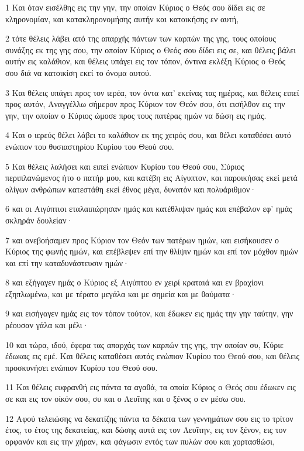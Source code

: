 \par 1 Και όταν εισέλθης εις την γην, την οποίαν Κύριος ο Θεός σου δίδει εις σε κληρονομίαν, και κατακληρονομήσης αυτήν και κατοικήσης εν αυτή,
\par 2 τότε θέλεις λάβει από της απαρχής πάντων των καρπών της γης, τους οποίους συνάξης εκ της γης σου, την οποίαν Κύριος ο Θεός σου δίδει εις σε, και θέλεις βάλει αυτήν εις καλάθιον, και θέλεις υπάγει εις τον τόπον, όντινα εκλέξη Κύριος ο Θεός σου διά να κατοικίση εκεί το όνομα αυτού.
\par 3 Και θέλεις υπάγει προς τον ιερέα, τον όντα κατ' εκείνας τας ημέρας, και θέλεις ειπεί προς αυτόν, Αναγγέλλω σήμερον προς Κύριον τον Θεόν σου, ότι εισήλθον εις την γην, την οποίαν ο Κύριος ώμοσε προς τους πατέρας ημών να δώση εις ημάς.
\par 4 Και ο ιερεύς θέλει λάβει το καλάθιον εκ της χειρός σου, και θέλει καταθέσει αυτό ενώπιον του θυσιαστηρίου Κυρίου του Θεού σου.
\par 5 Και θέλεις λαλήσει και ειπεί ενώπιον Κυρίου του Θεού σου, Σύριος περιπλανώμενος ήτο ο πατήρ μου, και κατέβη εις Αίγυπτον, και παροικήσας εκεί μετά ολίγων ανθρώπων κατεστάθη εκεί έθνος μέγα, δυνατόν και πολυάριθμον·
\par 6 και οι Αιγύπτιοι εταλαιπώρησαν ημάς και κατέθλιψαν ημάς και επέβαλον εφ' ημάς σκληράν δουλείαν·
\par 7 και ανεβοήσαμεν προς Κύριον τον Θεόν των πατέρων ημών, και εισήκουσεν ο Κύριος της φωνής ημών, και επέβλεψεν επί την θλίψιν ημών και επί τον μόχθον ημών και επί την καταδυνάστευσιν ημών·
\par 8 και εξήγαγεν ημάς ο Κύριος εξ Αιγύπτου εν χειρί κραταιά και εν βραχίονι εξηπλωμένω, και με τέρατα μεγάλα και με σημεία και με θαύματα·
\par 9 και εισήγαγεν ημάς εις τον τόπον τούτον, και έδωκεν εις ημάς την γην ταύτην, γην ρέουσαν γάλα και μέλι·
\par 10 και τώρα, ιδού, έφερα τας απαρχάς των καρπών της γης, την οποίαν συ, Κύριε έδωκας εις εμέ. Και θέλεις καταθέσει αυτάς ενώπιον Κυρίου του Θεού σου, και θέλεις προσκυνήσει ενώπιον Κυρίου του Θεού σου.
\par 11 Και θέλεις ευφρανθή εις πάντα τα αγαθά, τα οποία Κύριος ο Θεός σου έδωκεν εις σε και εις τον οίκόν σου, συ και ο Λευΐτης και ο ξένος ο εν μέσω σου.
\par 12 Αφού τελειώσης να δεκατίζης πάντα τα δέκατα των γεννημάτων σου εις το τρίτον έτος, το έτος της δεκατείας, και δώσης αυτά εις τον Λευΐτην, εις τον ξένον, εις τον ορφανόν και εις την χήραν, και φάγωσιν εντός των πυλών σου και χορτασθώσι,
